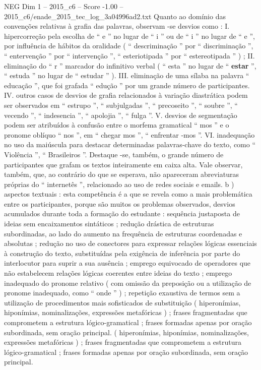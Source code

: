 \begin{textsample}{NEG Dim 1 – 2015\_c6 – Score -1.00 – 2015\_c6/enade\_2015\_tec\_log\_3a04996ad2.txt}
Quanto ao domínio das convenções relativas à grafia das palavras, observam -se desvios como : I. hipercorreção pela escolha de “ e ” no lugar de “ i ” ou de “ i ” no lugar de “ e ”, por influência de hábitos da oralidade ( “ descriminação ” por “ discriminação ”, “ entervenção ” por “ intervenção ”, “ esteriotipada ” por “ estereotipada ” ) ; II. eliminação do “ r ” marcador do infinitivo verbal ( “ esta ” no lugar de “ \textbf{estar} ”, “ estuda ” no lugar de “ estudar ” ).
III. eliminação de uma sílaba na palavra “ educação ”, que foi grafada “ edução ” por um grande número de participantes.
IV. outros casos de desvios de grafia relacionados à variação diastrática podem ser observados em “ estrupo ”, “ subjulgadas ”, “ precoseito ”, “ soubre ”, “ vecendo ”, “ indesencia ”, “ apolojia ”, “ fulga ”.
V. desvios de segmentação podem ser atribuídos à confusão entre o morfema gramatical “ mos ” e o pronome oblíquo “ nos ”, em “ chegar mos ”, “ enfrentar -mos ”.
VI. inadequação no uso da maiúscula para destacar determinadas palavras-chave do texto, como “ Violência ”, “ Brasileiros ”.
Destaque -se, também, o grande número de participantes que grafam os textos inteiramente em caixa alta.
Vale observar, também, que, ao contrário do que se esperava, não apareceram abreviaturas próprias do “ internetês ”, relacionado ao uso de redes sociais e emails. b ) aspectos textuais : esta competência é a que se revela como a mais problemática entre os participantes, porque são muitos os problemas observados, desvios acumulados durante toda a formação do estudante : sequência justaposta de ideias sem encaixamentos sintáticos ; redução drástica de estruturas subordinadas, ao lado do aumento na frequência de estruturas coordenadas e absolutas ; redução no uso de conectores para expressar relações lógicas essenciais à construção do texto, substituídas pela exigência de inferência por parte do interlocutor para suprir a sua ausência ; emprego equivocado de operadores que não estabelecem relações lógicas coerentes entre ideias do texto ; emprego inadequado do pronome relativo ( com omissão da preposição ou a utilização de pronome inadequado, como “ onde ” ) ; repetição exaustiva de termos sem a utilização de procedimentos mais sofisticados de substituição ( hiperonímias, hiponímias, nominalizações, expressões metafóricas ) ; frases fragmentadas que comprometem a estrutura lógico-gramatical ; frases formadas apenas por oração subordinada, sem oração principal. ( hiperonímias, hiponímias, nominalizações, expressões metafóricas ) ; frases fragmentadas que comprometem a estrutura lógico-gramatical ; frases formadas apenas por oração subordinada, sem oração principal.

\end{textsample}
